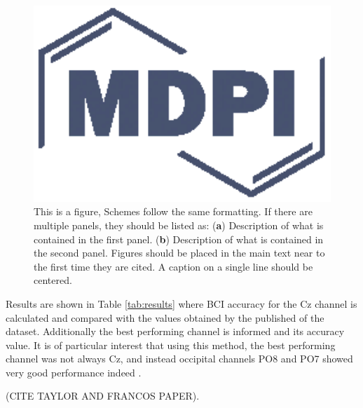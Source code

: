 \documentclass[entropy,article,submit,moreauthors,pdftex,10pt,a4paper]{mdpi}
\begin{document}
\begin{figure}[H]
\centering
\includegraphics[width=16cm]{subjectaveraged.eps}
\caption{This is a figure, Schemes follow the same formatting. If there are multiple panels, they should be listed as: (\textbf{a}) Description of what is contained in the first panel. (\textbf{b}) Description of what is contained in the second panel. Figures should be placed in the main text near to the first time they are cited. A caption on a single line should be centered.}
\label{fig:subjectaveraged}
\end{figure}

Results are shown in Table \ref{tab:results} where BCI accuracy
for the Cz channel is calculated and compared with the values obtained by the published of the dataset.  Additionally the best performing channel is informed and its accuracy value.  It is of particular interest that using this method, the best performing channel was not always Cz, and instead occipital channels PO8 and PO7 showed very good performance indeed \citep{Huggins2016,Jure2016}.

 (CITE TAYLOR AND  FRANCOS PAPER).
\end{document}

